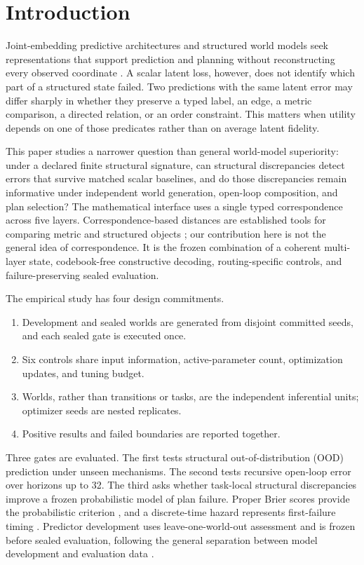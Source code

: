 \section{Introduction}
\label{sec:introduction}

Joint-embedding predictive architectures and structured world models seek
representations that support prediction and planning without reconstructing
every observed coordinate \citep{assran2023ijepa,assran2024vjepa,
kipf2020contrastive}.  A scalar latent loss, however, does not identify which
part of a structured state failed.  Two predictions with the same latent
error may differ sharply in whether they preserve a typed label, an edge, a
metric comparison, a directed relation, or an order constraint.  This matters
when utility depends on one of those predicates rather than on average latent
fidelity.

This paper studies a narrower question than general world-model superiority:
under a declared finite structural signature, can structural discrepancies
detect errors that survive matched scalar baselines, and do those
discrepancies remain informative under independent world generation,
open-loop composition, and plan selection?  The mathematical interface uses a
single typed correspondence across five layers.  Correspondence-based
distances are established tools for comparing metric and structured objects
\citep{memoli2011gromov,vayer2020fused}; our contribution here is not the
general idea of correspondence.  It is the frozen combination of a coherent
multi-layer state, codebook-free constructive decoding, routing-specific
controls, and failure-preserving sealed evaluation.

The empirical study has four design commitments.
\begin{enumerate}[label=(\roman*)]
    \item Development and sealed worlds are generated from disjoint committed
    seeds, and each sealed gate is executed once.
    \item Six controls share input information, active-parameter count,
    optimization updates, and tuning budget.
    \item Worlds, rather than transitions or tasks, are the independent
    inferential units; optimizer seeds are nested replicates.
    \item Positive results and failed boundaries are reported together.
\end{enumerate}

Three gates are evaluated.  The first tests structural out-of-distribution
(OOD) prediction under unseen mechanisms.  The second tests recursive
open-loop error over horizons up to 32.  The third asks whether task-local
structural discrepancies improve a frozen probabilistic model of plan
failure.  Proper Brier scores provide the probabilistic criterion
\citep{gneiting2007proper}, and a discrete-time hazard represents first-failure
timing \citep{singer1993time}.  Predictor development uses leave-one-world-out
assessment and is frozen before sealed evaluation, following the general
separation between model development and evaluation data
\citep{varma2006bias,collins2024tripod}.

